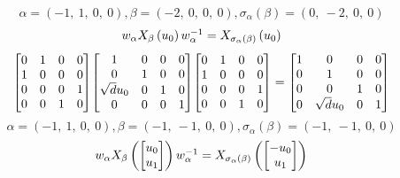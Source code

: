 \documentclass[11pt]{article}
\theoremstyle{definition}
\begin{document}
\[
\alpha = \left( -1, \  1, \  0, \  0\right), \beta = \left( -2, \  0, \  0, \  0\right), \sigma_{\alpha}(\beta) = \left( 0, \  -2, \  0, \  0\right)
\]
\[
\scaletoalign{\textwidth}{w_{\alpha} X_{\beta}\left(u_{0}\right) w_{\alpha}^{-1} = X_{\sigma_{\alpha}\left(\beta\right)}\left(u_{0}\right)}
\]
\[
\scaletoalign{\textwidth}{{\left[\begin{matrix}0 & 1 & 0 & 0\\1 & 0 & 0 & 0\\0 & 0 & 0 & 1\\0 & 0 & 1 & 0\end{matrix}\right]} {\left[\begin{matrix}1 & 0 & 0 & 0\\0 & 1 & 0 & 0\\\sqrt{d} u_{0} & 0 & 1 & 0\\0 & 0 & 0 & 1\end{matrix}\right]} {\left[\begin{matrix}0 & 1 & 0 & 0\\1 & 0 & 0 & 0\\0 & 0 & 0 & 1\\0 & 0 & 1 & 0\end{matrix}\right]} = {\left[\begin{matrix}1 & 0 & 0 & 0\\0 & 1 & 0 & 0\\0 & 0 & 1 & 0\\0 & \sqrt{d} u_{0} & 0 & 1\end{matrix}\right]}}
\]
\[
\alpha = \left( -1, \  1, \  0, \  0\right), \beta = \left( -1, \  -1, \  0, \  0\right), \sigma_{\alpha}(\beta) = \left( -1, \  -1, \  0, \  0\right)
\]
\[
\scaletoalign{\textwidth}{w_{\alpha} X_{\beta}\left(\left[\begin{matrix}u_{0}\\u_{1}\end{matrix}\right]\right) w_{\alpha}^{-1} = X_{\sigma_{\alpha}\left(\beta\right)}\left(\left[\begin{matrix}- u_{0}\\u_{1}\end{matrix}\right]\right)}
\]
\end{document}

